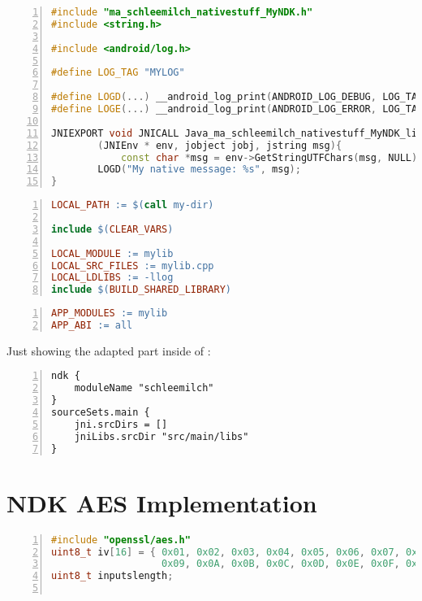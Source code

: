 \begin{appendices}
\begin{lstlisting}[language=C++, caption=mylib.cpp, label=nkd_sample_cpp, numbers=left]
#include "ma_schleemilch_nativestuff_MyNDK.h"
#include <string.h>

#include <android/log.h>

#define LOG_TAG "MYLOG"

#define LOGD(...) __android_log_print(ANDROID_LOG_DEBUG, LOG_TAG, __VA_ARGS__)
#define LOGE(...) __android_log_print(ANDROID_LOG_ERROR, LOG_TAG, __VA_ARGS__)

JNIEXPORT void JNICALL Java_ma_schleemilch_nativestuff_MyNDK_libExe
        (JNIEnv * env, jobject jobj, jstring msg){
        	const char *msg = env->GetStringUTFChars(msg, NULL);
        LOGD("My native message: %s", msg);
}
\end{lstlisting}

\begin{lstlisting}[language=make, caption=Android.mk, label=nkd_sample_make, numbers=left]
LOCAL_PATH := $(call my-dir)

include $(CLEAR_VARS)

LOCAL_MODULE := mylib
LOCAL_SRC_FILES := mylib.cpp
LOCAL_LDLIBS := -llog
include $(BUILD_SHARED_LIBRARY)
\end{lstlisting}

\begin{lstlisting}[language=make, caption=Application.mk, label=nkd_sample_app_make, numbers=left]
APP_MODULES := mylib
APP_ABI := all
\end{lstlisting}

Just showing the adapted part inside of :
\begin{lstlisting}[language=xml, caption=build.gradle, label=nkd_sample_gradle,
numbers=left]
ndk {
	moduleName "schleemilch"
}
sourceSets.main {
	jni.srcDirs = []
	jniLibs.srcDir "src/main/libs"
}
\end{lstlisting}


\chapter{NDK AES Implementation}\label{chapter:ndk_aes_implementation}
\begin{lstlisting}[language=C++, caption=AES Encrypt(), label=nkd_aes_encrypt, numbers=left]
#include "openssl/aes.h"
uint8_t iv[16] = { 0x01, 0x02, 0x03, 0x04, 0x05, 0x06, 0x07, 0x08,
                   0x09, 0x0A, 0x0B, 0x0C, 0x0D, 0x0E, 0x0F, 0x10};
uint8_t inputslength;


\end{lstlisting}
\end{appendices}
